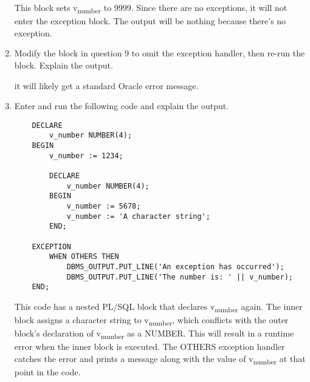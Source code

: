 \documentclass[11pt]{article}
\begin{document}
\begin{enumerate}
This block sets v\textsubscript{number} to 9999. Since there are no exceptions, it will not enter the exception block. The output will be nothing because there's no exception.

\item Modify the block in question 9 to omit the exception handler, then re-run the block. Explain the output.

it will likely get a standard Oracle error message.

\item Enter and run the following code and explain the output.
\begin{verbatim}
    DECLARE
        v_number NUMBER(4);
    BEGIN
        v_number := 1234;

        DECLARE
            v_number NUMBER(4);
        BEGIN
            v_number := 5678;
            v_number := 'A character string';
        END;

    EXCEPTION
        WHEN OTHERS THEN
            DBMS_OUTPUT.PUT_LINE('An exception has occurred');
            DBMS_OUTPUT.PUT_LINE('The number is: ' || v_number);
    END;
\end{verbatim}

This code has a nested PL/SQL block that declares v\textsubscript{number} again. The inner block assigns a character string to v\textsubscript{number}, which conflicts with the outer block's declaration of v\textsubscript{number} as a NUMBER. This will result in a runtime error when the inner block is executed. The OTHERS exception handler catches the error and prints a message along with the value of v\textsubscript{number} at that point in the code.
\end{enumerate}
\end{document}
